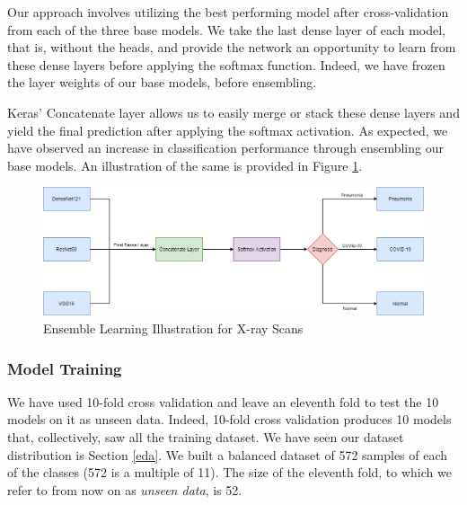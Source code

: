 Our approach involves utilizing the best performing model after cross-validation from each of the three base models. We take the last dense layer of each model, that is, without the heads, and provide the network an opportunity to learn from these dense layers before applying the softmax function. Indeed, we have frozen the layer weights of our base models, before ensembling. 

Keras' Concatenate layer \cite{CON} allows us to easily merge or stack these dense layers and yield the final prediction after applying the softmax activation. As expected, we have observed an increase in classification performance through ensembling our base models. An illustration of the same is provided in Figure \ref{fig:ensemble learning}.

\begin{figure}[H]
	\centering
	\includegraphics[width=15.5cm]{Images/Ensemble.png}
	\caption{\small Ensemble Learning Illustration for X-ray Scans}
	\label{fig:ensemble learning}
\end{figure}


\subsubsection{Model Training}

We have used 10-fold cross validation and leave an eleventh fold to test the 10 models on it as unseen data. Indeed, 10-fold cross validation produces 10 models that, collectively, saw all the training dataset. We have seen our dataset distribution is Section \ref{eda}. We built a balanced dataset of 572 samples of each of the classes (572 is a multiple of 11). The size of the eleventh fold, to which we refer to from now on as \textit{unseen data}, is 52. 

